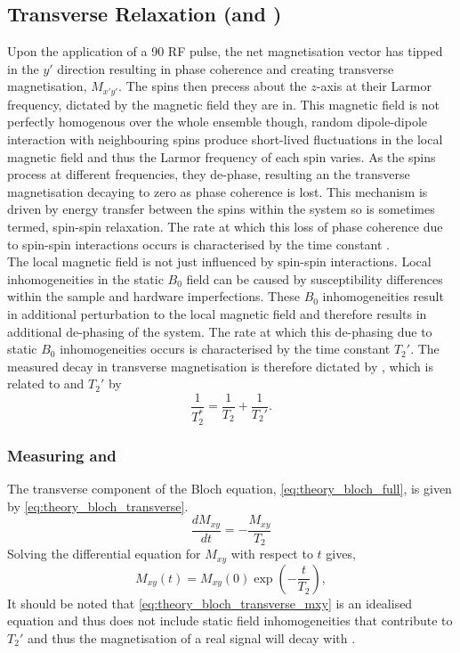 \subsection{Transverse Relaxation (\ttwo and \ttwostar)}
Upon the application of a 90\degree{ } \ac{RF} pulse, the net magnetisation vector has tipped in the $y'$ direction resulting in phase coherence and creating transverse magnetisation, $M_{x'y'}$. The spins then precess about the $z$-axis at their Larmor frequency, dictated by the magnetic field they are in. This magnetic field is not perfectly homogenous over the whole ensemble though, random dipole-dipole interaction with neighbouring spins produce short-lived fluctuations in the local magnetic field and thus the Larmor frequency of each spin varies. As the spins process at different frequencies, they de-phase, resulting an the transverse magnetisation decaying to zero as phase coherence is lost. This mechanism is driven by energy transfer between the spins within the system so is sometimes termed, spin-spin relaxation. The rate at which this loss of phase coherence due to spin-spin interactions occurs is characterised by the time constant \ttwo.\\

The local magnetic field is not just influenced by spin-spin interactions. Local inhomogeneities in the static $B_0$ field can be caused by susceptibility differences within the sample and hardware imperfections. These $B_0$  inhomogeneities result in additional perturbation to the local magnetic field and therefore results in additional de-phasing of the system. The rate at which this de-phasing due to static $B_0$ inhomogeneities occurs is characterised by the time constant $T_2'$. The measured decay in transverse magnetisation is therefore dictated by \ttwostar, which is related to \ttwo and $T_2'$ by
\begin{equation}
\frac{1}{T_2^*} = \frac{1}{T_2} + \frac{1}{T_2'}.
\end{equation}
\subsubsection{Measuring \ttwo and \ttwostar}
The transverse component of the Bloch equation, \eqref{eq:theory_bloch_full}, is given by \eqref{eq:theory_bloch_transverse}.
\begin{equation}
\frac{dM_{xy}}{dt} = - \frac{M_{xy}}{T_2}
\label{eq:theory_bloch_transverse}
\end{equation}
Solving the differential equation for $M_{xy}$ with respect to $t$ gives,
\begin{equation}
M_{xy}\left(t\right) = M_{xy}\left(0\right)\exp\left(-\frac{t}{T_2}\right),
\label{eq:theory_bloch_transverse_mxy}
\end{equation}
It should be noted that \eqref{eq:theory_bloch_transverse_mxy} is an idealised equation and thus does not include static field inhomogeneities that contribute to $T_2'$ and thus the magnetisation of a real signal will decay with \ttwostar.\\


